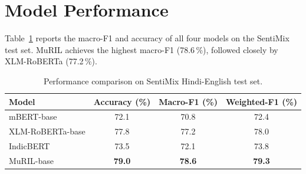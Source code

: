 \section{Model Performance}

Table~\ref{tab:results} reports the macro-F1 and accuracy of all four models on the SentiMix test set. MuRIL achieves the highest macro-F1 (78.6\,\%), followed closely by XLM-RoBERTa (77.2\,\%).

\begin{table}[htbp]
\centering
\caption{Performance comparison on SentiMix Hindi-English test set.}
\label{tab:results}
\begin{tabular}{@{}lccc@{}}
\toprule
\textbf{Model}    & \textbf{Accuracy (\%)} & \textbf{Macro-F1 (\%)} & \textbf{Weighted-F1 (\%)} \\
\midrule
mBERT-base        & 72.1 & 70.8 & 72.4 \\
XLM-RoBERTa-base  & 77.8 & 77.2 & 78.0 \\
IndicBERT         & 73.5 & 72.1 & 73.8 \\
MuRIL-base        & \textbf{79.0} & \textbf{78.6} & \textbf{79.3} \\
\bottomrule
\end{tabular}
\end{table}
